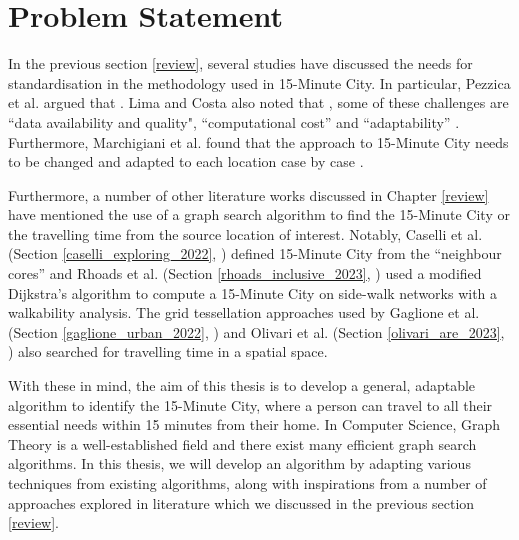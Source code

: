 \chapter{Problem Statement} \label{problem_statement}

In the previous section \ref{review}, several studies have discussed the needs for standardisation in the methodology used in 15-Minute City. In particular, Pezzica et al. argued that  \cite{Pezzica_Altafini_Mara_Chioni_2024}. Lima and Costa also noted that , some of these challenges are ``data availability and quality", ``computational cost'' and ``adaptability'' \cite{lima_quest_2023}. Furthermore, Marchigiani et al. found that the approach to 15-Minute City needs to be changed and adapted to each location case by case \cite{marchigiani_urban_2022}.

Furthermore, a number of other literature works discussed in Chapter \ref{review} have mentioned the use of a graph search algorithm to find the 15-Minute City or the travelling time from the source location of interest. Notably, Caselli et al. (Section \ref{caselli_exploring_2022}, \cite{caselli_exploring_2022}) defined 15-Minute City from the ``neighbour cores'' and Rhoads et al. (Section \ref{rhoads_inclusive_2023}, \cite{rhoads_inclusive_2023}) used a modified Dijkstra's algorithm to compute a 15-Minute City on side-walk networks with a walkability analysis. The grid tessellation approaches used by Gaglione et al. (Section \ref{gaglione_urban_2022}, \cite{gaglione_urban_2022}) and Olivari et al. (Section \ref{olivari_are_2023}, \cite{olivari_are_2023}) also searched for travelling time in a spatial space.

With these in mind, the aim of this thesis is to develop a general, adaptable algorithm to identify the 15-Minute City, where a person can travel to all their essential needs within 15 minutes from their home. In Computer Science, Graph Theory is a well-established field and there exist many efficient graph search algorithms. In this thesis, we will develop an algorithm by adapting various techniques from existing algorithms, along with inspirations from a number of approaches explored in literature which we discussed in the previous section \ref{review}.

